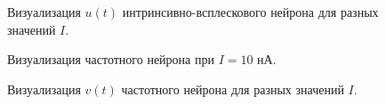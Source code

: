 \begin{figure}[h]
	\caption{Визуализация $u(t)$ интринсивно-всплескового нейрона для разных значений $I$.}
	\label{ib_different_I_recovery}
\end{figure}

\begin{figure}[h]
\caption{Визуализация частотного нейрона при $I=10$ нА.}
\label{1_ch}
\end{figure}

\begin{figure}[h]
	\caption{Визуализация $v(t)$ частотного нейрона для разных значений $I$.}
	\label{ch_different_I_potentials}
\end{figure}

